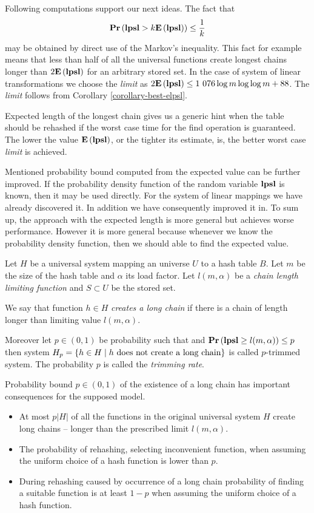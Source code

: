 Following computations support our next ideas. The fact that \[ \mathbf{Pr}\left(\mathbf{lpsl} > k \mathbf{E}\left(\mathbf{lpsl}\right)\right) \leq \frac{1}{k} \] may be obtained by direct use of the Markov's inequality. This fact for example means that less than half of all the universal functions create longest chains longer than $2 \mathbf{E}\left(\mathbf{lpsl}\right)$ for an arbitrary stored set. In the case of system of linear transformations we choose the \emph{limit} as $2\mathbf{E}\left(\mathbf{lpsl}\right) \leq \text{1 076} \log m \log \log m + 88$. The \emph{limit} follows from Corollary \ref{corollary-best-elpsl}.

Expected length of the longest chain gives us a generic hint when the table should be rehashed if the worst case time for the find operation is guaranteed. The lower the value $\mathbf{E}\left(\mathbf{lpsl}\right)$, or the tighter its estimate, is, the better worst case \emph{limit} is achieved.

Mentioned probability bound computed from the expected value can be further improved. If the probability density function of the random variable $\mathbf{lpsl}$ is known, then it may be used directly. For the system of linear mappings we have already discovered it. In addition we have consequently improved it in. To sum up, the approach with the expected length is more general but achieves worse performance. However it is more general because whenever we know the probability density function, then we should able to find the expected value.

\begin{definition}
Let $H$ be a universal system mapping an universe $U$ to a hash table $B$. Let $m$ be the size of the hash table and $\alpha$ its load factor. Let $l(m, \alpha)$ be a \emph{chain length limiting function} and $S \subset U$ be the stored set. 

We say that function $h \in H$ \emph{creates a long chain} if there is a chain of length longer than limiting value $l(m, \alpha)$.

Moreover let $p \in (0, 1)$ be probability such that and $\mathbf{Pr}\left(\mathbf{lpsl} \geq l(m, \alpha)\right) \leq p$ then system $H_p = \{ h \in H \mid h \text{ does not create a long chain} \}$ is called $p$-trimmed system. The probability $p$ is called the \emph{trimming rate}.
\end{definition}

Probability bound $p \in (0, 1)$ of the existence of a long chain has important consequences for the supposed model.
\begin{itemize}
\item At most $p|H|$ of all the functions in the original universal system $H$ create long chains -- longer than the prescribed limit $l(m, \alpha)$. 
\item The probability of rehashing, selecting inconvenient function, when assuming the uniform choice of a hash function is lower than $p$.
\item During rehashing caused by occurrence of a long chain probability of finding a suitable function is at least $1 - p$ when assuming the uniform choice of a hash function.
\end{itemize}

